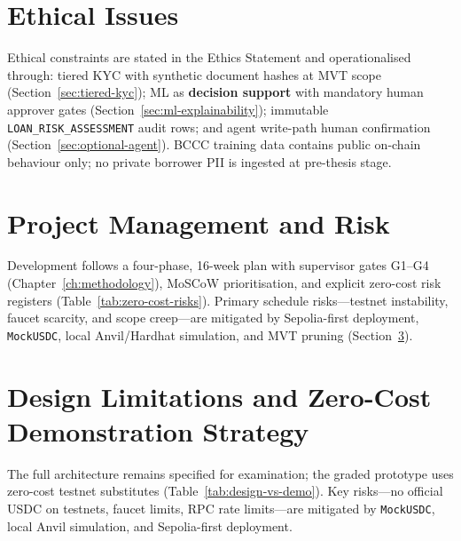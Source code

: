 \documentclass[12pt,a4paper]{report}
\begin{document}
\section{Ethical Issues}
\label{sec:ethical-issues}

Ethical constraints are stated in the Ethics Statement and operationalised through: tiered KYC with synthetic document hashes at MVT scope (Section~\ref{sec:tiered-kyc}); ML as \textbf{decision support} with mandatory human approver gates (Section~\ref{sec:ml-explainability}); immutable \texttt{LOAN\_RISK\_ASSESSMENT} audit rows; and agent write-path human confirmation (Section~\ref{sec:optional-agent}). BCCC training data contains public on-chain behaviour only; no private borrower PII is ingested at pre-thesis stage.

\section{Project Management and Risk}
\label{sec:project-management-risk}

Development follows a four-phase, 16-week plan with supervisor gates G1--G4 (Chapter~\ref{ch:methodology}), MoSCoW prioritisation, and explicit zero-cost risk registers (Table~\ref{tab:zero-cost-risks}). Primary schedule risks---testnet instability, faucet scarcity, and scope creep---are mitigated by Sepolia-first deployment, \texttt{MockUSDC}, local Anvil/Hardhat simulation, and MVT pruning (Section~\ref{sec:design-limitations}).

\section{Design Limitations and Zero-Cost Demonstration Strategy}
\label{sec:design-limitations}

The full architecture remains specified for examination; the graded prototype uses zero-cost testnet substitutes (Table~\ref{tab:design-vs-demo}). Key risks---no official USDC on testnets, faucet limits, RPC rate limits---are mitigated by \texttt{MockUSDC}, local Anvil simulation, and Sepolia-first deployment.
\end{document}
